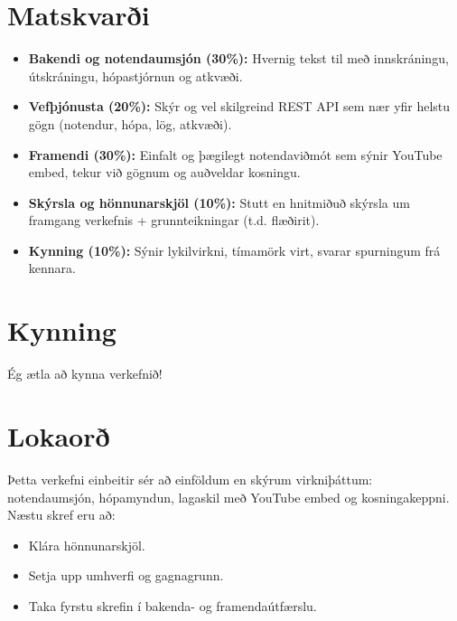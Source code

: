 \documentclass{article}
\begin{document}
\section{Matskvarði}
\begin{itemize}
    \item \textbf{Bakendi og notendaumsjón (30\%):}  
    Hvernig tekst til með innskráningu, útskráningu, hópastjórnun og atkvæði.
    \item \textbf{Vefþjónusta (20\%):}  
    Skýr og vel skilgreind REST API sem nær yfir helstu gögn (notendur, hópa, lög, atkvæði).
    \item \textbf{Framendi (30\%):}  
    Einfalt og þægilegt notendaviðmót sem sýnir YouTube embed, tekur við gögnum og auðveldar kosningu.
    \item \textbf{Skýrsla og hönnunarskjöl (10\%):}  
    Stutt en hnitmiðuð skýrsla um framgang verkefnis + grunnteikningar (t.d. flæðirit).
    \item \textbf{Kynning (10\%):}  
    Sýnir lykilvirkni, tímamörk virt, svarar spurningum frá kennara.
\end{itemize}

\section{Kynning}
Ég ætla að kynna verkefnið!

\section{Lokaorð}
Þetta verkefni einbeitir sér að einföldum en skýrum virkniþáttum: notendaumsjón, hópamyndun, lagaskil með YouTube embed og kosningakeppni. Næstu skref eru að:
\begin{itemize}
    \item Klára hönnunarskjöl.
    \item Setja upp umhverfi og gagnagrunn.
    \item Taka fyrstu skrefin í bakenda- og framendaútfærslu.
\end{itemize}
\end{document}
